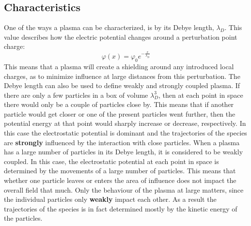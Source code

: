\subsection{Characteristics}
\label{subsec:plasma characteristics}
One of the ways a plasma can be characterized, is by its Debye length, $\lambda_D$. This value describes how the electric potential changes around a perturbation point charge:
\[\varphi(x) = \varphi_0 e^{-\frac{x}{\lambda_D}}\]  
This means that a plasma will create a shielding around any introduced local charges, as to minimize influence at large distances from this perturbation.
The Debye length can also be used to define weakly and strongly coupled plasma. If there are only a few particles in a box of volume $\lambda_D^3$, then at each point in space there would only be a couple of particles close by. This means that if another particle would get closer or one of the present particles went further, then the potential energy at that point would sharply increase or decrease, respectively. In this case the electrostatic potential is dominant and the trajectories of the species are \textbf{strongly} influenced by the interaction with close particles.
When a plasma has a large number of particles in its Debye length, it is considered to be weakly coupled. In this case, the electrostatic potential at each point in space is determined by the movements of a large number of particles. This means that whether one particle leaves or enters the area of influence does not impact the overall field that much. Only the behaviour of the plasma at large matters, since the individual particles only \textbf{weakly} impact each other. As a result the trajectories of the species is in fact determined mostly by the kinetic energy of the particles.\cite{giovanni_lapenta_introduction_nodate}
\newline
